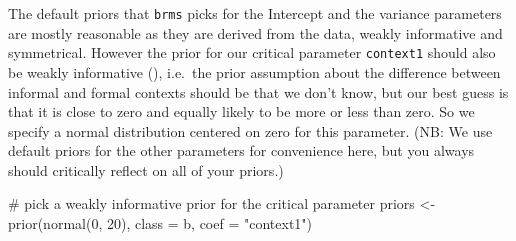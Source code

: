 \documentclass[
  doc,
  floatsintext,
  longtable,
  nolmodern,
  notxfonts,
  notimes,
  colorlinks=true,linkcolor=blue,citecolor=blue,urlcolor=blue]{apa7}
\newenvironment{Shaded}{\begin{snugshade}}{\end{snugshade}}
\newcommand{\AttributeTok}[1]{\textcolor[rgb]{0.40,0.45,0.13}{#1}}
\newcommand{\CommentTok}[1]{\textcolor[rgb]{0.37,0.37,0.37}{#1}}
\newcommand{\DecValTok}[1]{\textcolor[rgb]{0.68,0.00,0.00}{#1}}
\newcommand{\FloatTok}[1]{\textcolor[rgb]{0.68,0.00,0.00}{#1}}
\newcommand{\FunctionTok}[1]{\textcolor[rgb]{0.28,0.35,0.67}{#1}}
\newcommand{\NormalTok}[1]{\textcolor[rgb]{0.00,0.23,0.31}{#1}}
\newcommand{\OtherTok}[1]{\textcolor[rgb]{0.00,0.23,0.31}{#1}}
\newcommand{\SpecialCharTok}[1]{\textcolor[rgb]{0.37,0.37,0.37}{#1}}
\newcommand{\StringTok}[1]{\textcolor[rgb]{0.13,0.47,0.30}{#1}}
\begin{document}
\begin{Shaded}
\end{Shaded}

The default priors that \texttt{brms} picks for the Intercept and the
variance parameters are mostly reasonable as they are derived from the
data, weakly informative and symmetrical. However the prior for our
critical parameter \texttt{context1} should also be weakly informative
(), i.e.~the prior assumption about the difference between informal
and formal contexts should be that we don't know, but our best guess is
that it is close to zero and equally likely to be more or less than
zero. So we specify a normal distribution centered on zero for this
parameter. (NB: We use default priors for the other parameters for
convenience here, but you always should critically reflect on all of
your priors.)

\begin{Shaded}
\begin{Highlighting}[]
\CommentTok{\# pick a weakly informative prior for the critical parameter}
\NormalTok{priors }\OtherTok{\textless{}{-}} \FunctionTok{prior}\NormalTok{(}\FunctionTok{normal}\NormalTok{(}\DecValTok{0}\NormalTok{, }\DecValTok{20}\NormalTok{), }
                \AttributeTok{class =}\NormalTok{ b, }
                \AttributeTok{coef =} \StringTok{"context1"}\NormalTok{)}
\end{Highlighting}
\end{Shaded}
\end{document}

